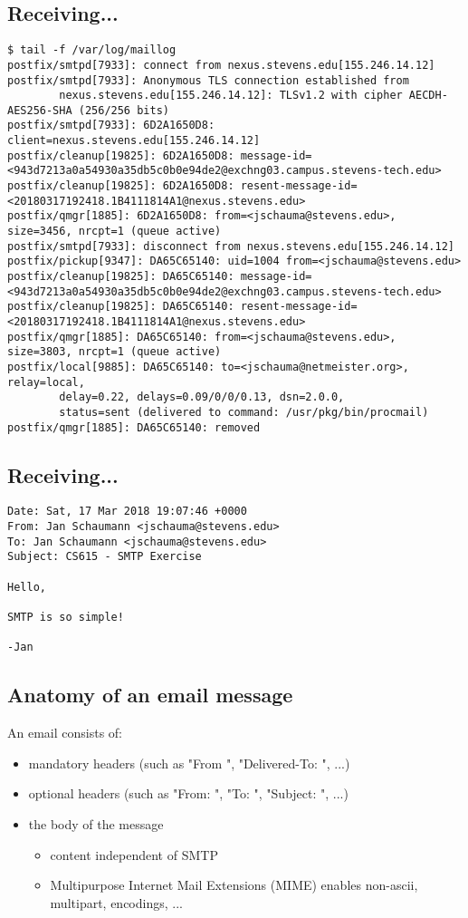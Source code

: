 \documentclass[xga]{xdvislides}
\begin{document}
\subsection{Receiving...}
\smallish
\begin{verbatim}
$ tail -f /var/log/maillog
postfix/smtpd[7933]: connect from nexus.stevens.edu[155.246.14.12]
postfix/smtpd[7933]: Anonymous TLS connection established from
        nexus.stevens.edu[155.246.14.12]: TLSv1.2 with cipher AECDH-AES256-SHA (256/256 bits)
postfix/smtpd[7933]: 6D2A1650D8: client=nexus.stevens.edu[155.246.14.12]
postfix/cleanup[19825]: 6D2A1650D8: message-id=<943d7213a0a54930a35db5c0b0e94de2@exchng03.campus.stevens-tech.edu>
postfix/cleanup[19825]: 6D2A1650D8: resent-message-id=<20180317192418.1B4111814A1@nexus.stevens.edu>
postfix/qmgr[1885]: 6D2A1650D8: from=<jschauma@stevens.edu>, size=3456, nrcpt=1 (queue active)
postfix/smtpd[7933]: disconnect from nexus.stevens.edu[155.246.14.12]
postfix/pickup[9347]: DA65C65140: uid=1004 from=<jschauma@stevens.edu>
postfix/cleanup[19825]: DA65C65140: message-id=<943d7213a0a54930a35db5c0b0e94de2@exchng03.campus.stevens-tech.edu>
postfix/cleanup[19825]: DA65C65140: resent-message-id=<20180317192418.1B4111814A1@nexus.stevens.edu>
postfix/qmgr[1885]: DA65C65140: from=<jschauma@stevens.edu>, size=3803, nrcpt=1 (queue active)
postfix/local[9885]: DA65C65140: to=<jschauma@netmeister.org>, relay=local,
        delay=0.22, delays=0.09/0/0/0.13, dsn=2.0.0,
        status=sent (delivered to command: /usr/pkg/bin/procmail)
postfix/qmgr[1885]: DA65C65140: removed
\end{verbatim}
\Normalsize


\subsection{Receiving...}
\begin{verbatim}
Date: Sat, 17 Mar 2018 19:07:46 +0000
From: Jan Schaumann <jschauma@stevens.edu>
To: Jan Schaumann <jschauma@stevens.edu>
Subject: CS615 - SMTP Exercise

Hello,

SMTP is so simple!

-Jan
\end{verbatim}

\subsection{Anatomy of an email message}
An email consists of:
\begin{itemize}
	\item mandatory headers (such as "From ", "Delivered-To: ", ...)
	\item optional headers (such as "From: ", "To: ", "Subject: ", ...)
	\item the body of the message
	\begin{itemize}
		\item content independent of SMTP
		\item Multipurpose Internet Mail Extensions (MIME) enables non-ascii, multipart, encodings, ...
	\end{itemize}
\end{itemize}
\end{document}
